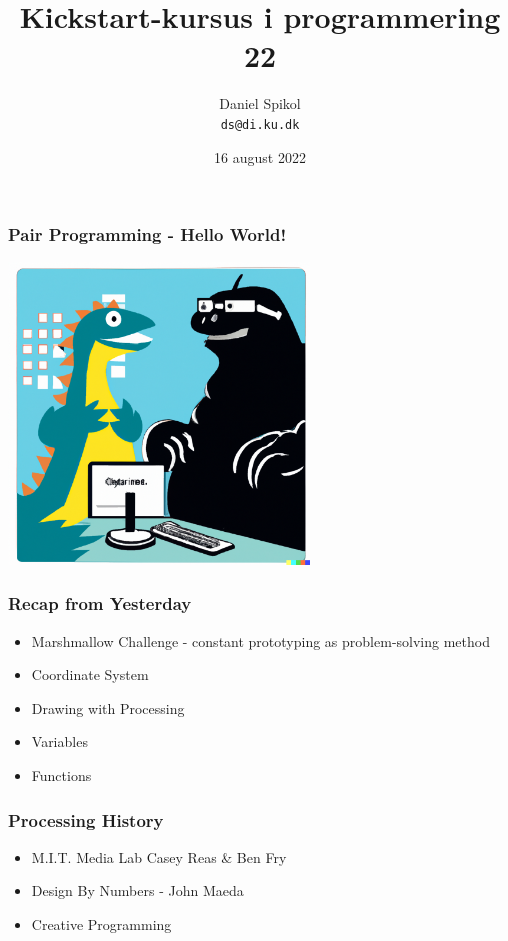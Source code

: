 \documentclass[10pt]{beamer}
\title[Kickstart-kursus] %
  {Kickstart-kursus i programmering 22} %
\author{\footnotesize{Daniel Spikol} \\
          \footnotesize{\texttt{ds@di.ku.dk}}}
\institute {DIKU \\ Københavns Universitet}
\date[16. august 2022]{16 august 2022}
\begin{document}
\begin{frame}[plain]
\titlepage
\end{frame}


\begin{frame}
   \frametitle{Pair Programming - Hello World!}
   	 \includegraphics[height=8cm]{images/pairprog}
\end{frame}

\begin{frame}
   \frametitle{Recap from Yesterday}
   	\begin{itemize}
	\item Marshmallow Challenge - constant prototyping as problem-solving method
	\item Coordinate System 
	\item Drawing with Processing
	\item Variables
	\item Functions
	\end{itemize}
\end{frame}

\begin{frame}
   \frametitle{Processing History}
   	\begin{itemize}
	\item M.I.T. Media Lab Casey Reas \& Ben Fry
	\item Design By Numbers  - John Maeda
	\item Creative Programming
	\end{itemize}
\end{frame}
\end{document}
